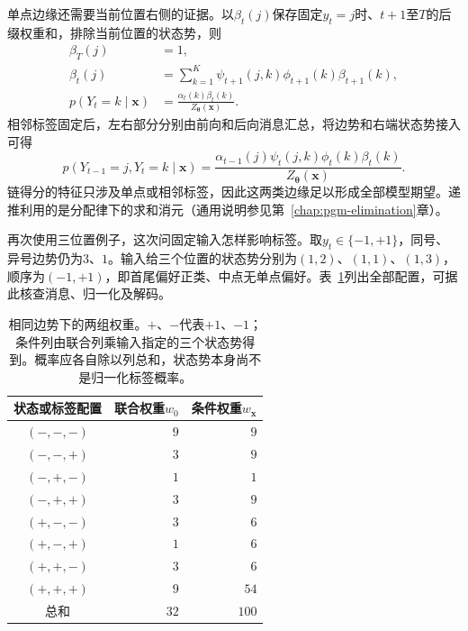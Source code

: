 单点边缘还需要当前位置右侧的证据。以$\beta_t(j)$保存固定$y_t=j$时、$t+1$至$T$的后缀权重和，排除当前位置的状态势，则
\begin{equation}
  \begin{aligned}
    \beta_T(j)&=1,\\
    \beta_t(j)&=\sum_{k=1}^K
         \psi_{t+1}(j,k)\phi_{t+1}(k)\beta_{t+1}(k),\\
    p(Y_t=k\mid\bm{x})
      &=\frac{\alpha_t(k)\beta_t(k)}{Z_{\bm{\theta}}(\bm{x})}.
  \end{aligned}
  \label{eq:pgm-energy-models-backward}
\end{equation}
相邻标签固定后，左右部分分别由前向和后向消息汇总，将边势和右端状态势接入可得
\begin{equation}
  p(Y_{t-1}=j,Y_t=k\mid\bm{x})
   =\frac{\alpha_{t-1}(j)\psi_t(j,k)
                   \phi_t(k)\beta_t(k)}
          {Z_{\bm{\theta}}(\bm{x})}.
  \label{eq:pgm-energy-models-edge-marginal}
\end{equation}
链得分的特征只涉及单点或相邻标签，因此这两类边缘足以形成全部模型期望。递推利用的是分配律下的求和消元（通用说明参见第~\ref{chap:pgm-elimination}章）。

再次使用三位置例子，这次问固定输入怎样影响标签。取$y_t\in\{-1,+1\}$，同号、异号边势仍为$3$、$1$。输入给三个位置的状态势分别为$(1,2)$、$(1,1)$、$(1,3)$，顺序为$(-1,+1)$，即首尾偏好正类、中点无单点偏好。表~\ref{tab:pgm-energy-models-chain-weights}列出全部配置，可据此核查消息、归一化及解码。

\begin{table}[htbp]
  \centering
  \begin{tabular}{crr}
    \toprule
    状态或标签配置 & 联合权重$w_0$ & 条件权重$w_{\bm{x}}$\\
    \midrule
    $(-,-,-)$ & $9$ & $9$\\
    $(-,-,+)$ & $3$ & $9$\\
    $(-,+,-)$ & $1$ & $1$\\
    $(-,+,+)$ & $3$ & $9$\\
    $(+,-,-)$ & $3$ & $6$\\
    $(+,-,+)$ & $1$ & $6$\\
    $(+,+,-)$ & $3$ & $6$\\
    $(+,+,+)$ & $9$ & $54$\\
    \midrule
    总和 & $32$ & $100$\\
    \bottomrule
  \end{tabular}
  \caption{相同边势下的两组权重。$+$、$-$代表$+1$、$-1$；条件列由联合列乘输入指定的三个状态势得到。概率应各自除以列总和，状态势本身尚不是归一化标签概率。}
  \label{tab:pgm-energy-models-chain-weights}
\end{table}

